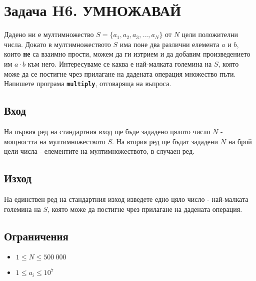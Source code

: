 \documentclass[12pt]{article}
\begin{document}
\section{Задача H6. УМНОЖАВАЙ}

Дадено ни е мултимножество $S=\{a_1, a_2, a_3, \dots, a_N\}$ от $N$ цели положителни числа. Докато в мултимножеството $S$ има поне два различни елемента $a$ и $b$, които \textbf{не} са взаимно прости, можем да ги изтрием и да добавим произведението им $a \cdot b$ към него. Интересуваме се каква е най-малката големина на $S$, която може да се постигне чрез прилагане на дадената операция множество пъти. Напишете програма \textbf{\texttt{multiply}}, отговаряща на въпроса.


\subsection{Вход}

На първия ред на стандартния вход ще бъде зададено цялото число $N$ - мощността на мултимножеството $S$. На втория ред ще бъдат зададени $N$ на брой цели числа - елементите на мултимножеството, в случаен ред.

\subsection{Изход}

На единствен ред на стандартния изход изведете едно цяло число - най-малката големина на $S$, която може да постигне чрез прилагане на дадената операция.


\subsection{Ограничения}

\vspace{0.1em}
\begin{itemize}
	\item $1 \leq N \leq 500~000$
	\item $1 \leq a_i \leq 10^7$
\end{itemize}
\end{document}
